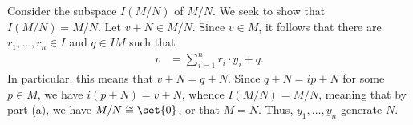 \documentclass[10pt]{mypackage}
\begin{document}
\begin{solution}
\begin{enumerate}[(a)]
      Consider the subspace $I\left( M/N \right)$ of $M/N$. We seek to show that $I\left( M/N \right) = M/N$. Let $v + N\in M/N$. Since $v\in M$, it follows that there are $r_1,\dots,r_n\in I$ and $q\in IM$ such that
      \begin{align*}
        v &= \sum_{i=1}^{n} r_i\cdot y_i + q.
      \end{align*}
      In particular, this means that $v + N = q + N$. Since $q + N = ip + N$ for some $p\in M$, we have $i\left( p + N \right) = v + N$, whence $I\left( M/N \right) = M/N$, meaning that by part (a), we have $M/N\cong \set{0}$, or that $M = N$. Thus, $y_1,\dots,y_n$ generate $N$.
  \end{enumerate}
\end{solution}
\end{document}
